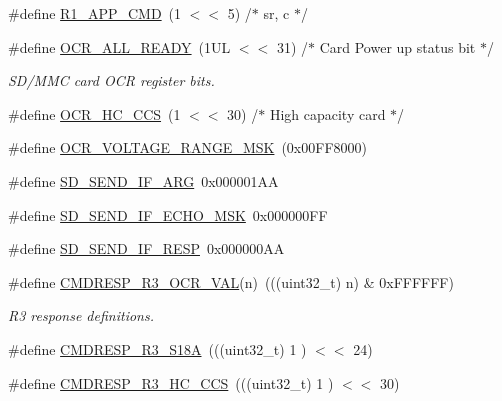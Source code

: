 \begin{DoxyCompactItemize}
\item 
\#define \hyperlink{group___c_h_i_p___s_d_m_m_c___definitions_gadc3731837f30501aecdd3f9baa6ca8f8}{R1\+\_\+\+A\+P\+P\+\_\+\+C\+MD}~(1 $<$$<$ 5)	/$\ast$ sr, c $\ast$/
\item 
\#define \hyperlink{group___c_h_i_p___s_d_m_m_c___definitions_ga59ca709ab54ad0dc394a76f940fbd884}{O\+C\+R\+\_\+\+A\+L\+L\+\_\+\+R\+E\+A\+DY}~(1\+U\+L $<$$<$ 31)	/$\ast$ Card Power up status bit $\ast$/
\begin{DoxyCompactList}\small\item\em S\+D/\+M\+MC card O\+CR register bits. \end{DoxyCompactList}\item 
\#define \hyperlink{group___c_h_i_p___s_d_m_m_c___definitions_gad55c91f9dd1f79cc0e96644f478ca2e7}{O\+C\+R\+\_\+\+H\+C\+\_\+\+C\+CS}~(1 $<$$<$ 30)	/$\ast$ High capacity card $\ast$/
\item 
\#define \hyperlink{group___c_h_i_p___s_d_m_m_c___definitions_gab2942fd3806a958856a9ade4d0843b87}{O\+C\+R\+\_\+\+V\+O\+L\+T\+A\+G\+E\+\_\+\+R\+A\+N\+G\+E\+\_\+\+M\+SK}~(0x00\+F\+F8000)
\item 
\#define \hyperlink{group___c_h_i_p___s_d_m_m_c___definitions_ga68165be37eead48db1f60d2a58f802c3}{S\+D\+\_\+\+S\+E\+N\+D\+\_\+\+I\+F\+\_\+\+A\+RG}~0x000001\+AA
\item 
\#define \hyperlink{group___c_h_i_p___s_d_m_m_c___definitions_gaf88a2c05cd91f10749d2f712e91021c1}{S\+D\+\_\+\+S\+E\+N\+D\+\_\+\+I\+F\+\_\+\+E\+C\+H\+O\+\_\+\+M\+SK}~0x000000\+FF
\item 
\#define \hyperlink{group___c_h_i_p___s_d_m_m_c___definitions_ga81cf2c72aa340c62eaf44979006196a4}{S\+D\+\_\+\+S\+E\+N\+D\+\_\+\+I\+F\+\_\+\+R\+E\+SP}~0x000000\+AA
\item 
\#define \hyperlink{group___c_h_i_p___s_d_m_m_c___definitions_ga98809fef68c56d6acba0fe60109809ae}{C\+M\+D\+R\+E\+S\+P\+\_\+\+R3\+\_\+\+O\+C\+R\+\_\+\+V\+AL}(n)~(((uint32\+\_\+t) n) \& 0x\+F\+F\+F\+F\+F\+F)
\begin{DoxyCompactList}\small\item\em R3 response definitions. \end{DoxyCompactList}\item 
\#define \hyperlink{group___c_h_i_p___s_d_m_m_c___definitions_ga3e13a11c494296746bd45c31bc258730}{C\+M\+D\+R\+E\+S\+P\+\_\+\+R3\+\_\+\+S18A}~(((uint32\+\_\+t) 1 ) $<$$<$ 24)
\item 
\#define \hyperlink{group___c_h_i_p___s_d_m_m_c___definitions_gab1c9a286bf5c87e99580c691f8b21bfa}{C\+M\+D\+R\+E\+S\+P\+\_\+\+R3\+\_\+\+H\+C\+\_\+\+C\+CS}~(((uint32\+\_\+t) 1 ) $<$$<$ 30)
$$
\end{DoxyCompactItemize}
